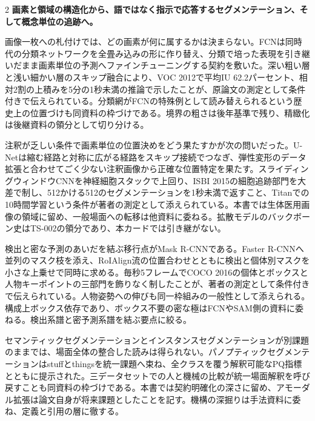 \documentclass[lualatex,a4paper,10pt]{jlreq}
\begin{document}
\begin{multicols}{2}
\raggedcolumns
\noindent\textbf{画素と領域の構造化から、語ではなく指示で応答するセグメンテーション、そして概念単位の追跡へ。}\autocite{vmd013,vmd015,vmd017,vmd018,vmd115}\par\medskip
\noindent 画像一枚への札付けでは、どの画素が何に属するかは決まらない。FCNは同時代の分類ネットワークを全畳み込みの形に作り替え、分類で培った表現を引き継いだまま画素単位の予測へファインチューニングする契約を敷いた。深い粗い層と浅い細かい層のスキップ融合により、VOC 2012で平均IU 62.2パーセント、相対2割の上積みを5分の1秒未満の推論で示したことが、原論文の測定として条件付きで伝えられている。分類網がFCNの特殊例として読み替えられるという歴史上の位置づけも同資料の枠づけである。境界の粗さは後年基準で残り、精緻化は後継資料の領分として切り分ける。\autocite{vmd013}\par\medskip
\noindent 注釈が乏しい条件で画素単位の位置決めをどう果たすかが次の問いだった。U-Netは縮む経路と対称に広がる経路をスキップ接続でつなぎ、弾性変形のデータ拡張と合わせてごく少ない注釈画像から正確な位置特定を果たす。スライディングウィンドウCNNを神経細胞スタックで上回り、ISBI 2015の細胞追跡部門を大差で制し、512かける512のセグメンテーションを1秒未満で返すこと、Titanでの10時間学習という条件が著者の測定として添えられている。本書では生体医用画像の領域に留め、一般場面への転移は他資料に委ねる。拡散モデルのバックボーン史はTS-002の領分であり、本カードでは引き継がない。\autocite{vmd014}\par\medskip
\noindent 検出と密な予測のあいだを結ぶ移行点がMask R-CNNである。Faster R-CNNへ並列のマスク枝を添え、RoIAlign流の位置合わせとともに検出と個体別マスクを小さな上乗せで同時に求める。毎秒5フレームでCOCO 2016の個体とボックスと人物キーポイントの三部門を飾りなく制したことが、著者の測定として条件付きで伝えられている。人物姿勢への伸びも同一枠組みの一般性として添えられる。構成上ボックス依存であり、ボックス不要の密な極はFCNやSAM側の資料に委ねる。検出系譜と密予測系譜を結ぶ要点に絞る。\autocite{vmd015}\par\medskip
\noindent セマンティックセグメンテーションとインスタンスセグメンテーションが別課題のままでは、場面全体の整合した読みは得られない。パノプティックセグメンテーションはstuffとthingsを統一課題へ束ね、全クラスを覆う解釈可能なPQ指標とともに提示された。三データセットでの人と機械の比較が統一場面解釈を呼び戻すことも同資料の枠づけである。本書では契約明確化の深さに留め、アモーダル拡張は論文自身が将来課題としたことを記す。機構の深掘りは手法資料に委ね、定義と引用の層に徹する。\autocite{vmd016}\par\medskip

\end{multicols}
\end{document}

